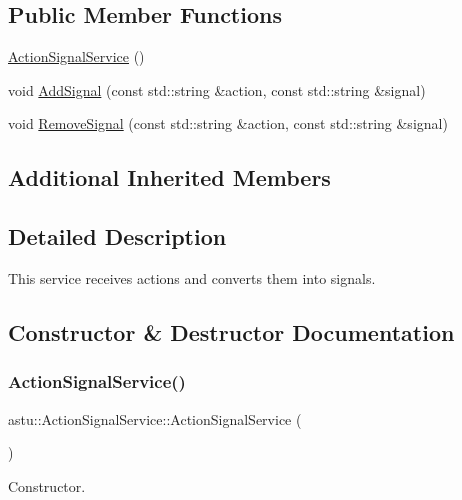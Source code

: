 \subsection*{Public Member Functions}
\begin{DoxyCompactItemize}
\item 
\hyperlink{classastu_1_1ActionSignalService_ad37b42544d39ddbca48668e18c4055d8}{Action\+Signal\+Service} ()
\item 
void \hyperlink{classastu_1_1ActionSignalService_a21b2cca24b3835063b4bf1d59157ab80}{Add\+Signal} (const std\+::string \&action, const std\+::string \&signal)
\item 
void \hyperlink{classastu_1_1ActionSignalService_ae9e72c9808b02e9dbdb6ad164a535514}{Remove\+Signal} (const std\+::string \&action, const std\+::string \&signal)
\end{DoxyCompactItemize}
\subsection*{Additional Inherited Members}


\subsection{Detailed Description}
This service receives actions and converts them into signals. 

\subsection{Constructor \& Destructor Documentation}
\mbox{\label{classastu_1_1ActionSignalService_ad37b42544d39ddbca48668e18c4055d8}} 
\subsubsection{\texorpdfstring{Action\+Signal\+Service()}{ActionSignalService()}}
{\footnotesize\ttfamily astu\+::\+Action\+Signal\+Service\+::\+Action\+Signal\+Service (\begin{DoxyParamCaption}{ }\end{DoxyParamCaption})}

Constructor. 

